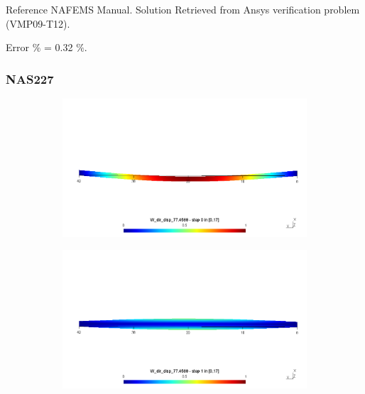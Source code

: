 \documentclass[9pt]{beamer}
\begin{document}
\begin{frame}
\begin{block}{Reference}
NAFEMS Manual. Solution Retrieved from Ansys verification problem (VMP09-T12).
\end{block}
Error $\%$ = 0.32 $\%$.



\end{frame}



\begin{frame}
\frametitle{NAS227}


\begin{figure}[h!]
\centering
\begin{subfigure}{.8\textwidth}
\includegraphics[width=\linewidth,trim={0 8cm 0 8cm},clip]{NAS277_pos_1.png}
\end{subfigure} \vfill
\begin{subfigure}{.8\textwidth}
\includegraphics[width=\linewidth,trim={0 8cm 0 8cm},clip]{NAS277_pos_2.png}
\end{subfigure}\vfill
\begin{subfigure}{.8\textwidth}

\end{subfigure}
\end{figure}
\end{frame}
\end{document}
